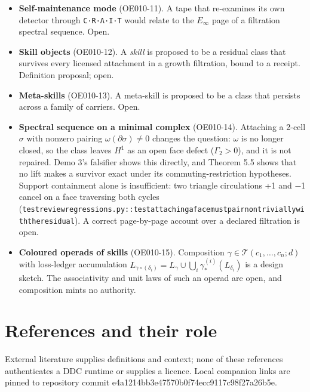 \documentclass[
  11pt,
]{article}
\providecommand{\tightlist}{%
  \setlength{\itemsep}{0pt}\setlength{\parskip}{0pt}}
\renewcommand{\_}{\ddcunderscore\allowbreak}
\begin{document}
\begin{itemize}
\tightlist
\item
  \textbf{Self-maintenance mode} (OE010-11). A tape that re-examines its
  own detector through \texttt{C·R·Λ·I·T} would relate to the
  \(E_\infty\) page of a filtration spectral sequence. Open.
\item
  \textbf{Skill objects} (OE010-12). A \emph{skill} is proposed to be a
  residual class that survives every licensed attachment in a growth
  filtration, bound to a receipt. Definition proposal; open.
\item
  \textbf{Meta-skills} (OE010-13). A meta-skill is proposed to be a
  class that persists across a family of carriers. Open.
\item
  \textbf{Spectral sequence on a minimal complex} (OE010-14). Attaching
  a 2-cell \(\sigma\) with nonzero pairing
  \(\omega(\partial\sigma) \ne 0\) changes the question: \(\omega\) is
  no longer closed, so the class leaves \(H^1\) as an open face defect
  (\(\Gamma_2 > 0\)), and it is not repaired. Demo 3's falsifier shows
  this directly, and Theorem 5.5 shows that no lift makes a survivor
  exact under its commuting-restriction hypotheses. Support containment
  alone is insufficient: two triangle circulations +1 and −1 cancel on a
  face traversing both cycles
  (\texttt{test\_review\_regressions.\allowbreak py::test\_attaching\_a\_face\_must\_pair\_nontrivially\_with\_the\_residual}).
  A correct page-by-page account over a declared filtration is open.
\item
  \textbf{Coloured operads of skills} (OE010-15). Composition
  \(\gamma \in \mathcal{T}(c_1, \dots, c_n; d)\) with loss-ledger
  accumulation
  \(L_{\gamma \circ (\delta_i)} = L_\gamma \cup \bigcup_i \gamma^{(i)}_*(L_{\delta_i})\)
  is a design sketch. The associativity and unit laws of such an operad
  are open, and composition mints no authority.
\end{itemize}

\newpage

\section{References and their role}\label{references-and-their-role}

External literature supplies definitions and context; none of these
references authenticates a DDC runtime or supplies a licence. Local
companion links are pinned to repository commit
e4a1214bb3e47570b0f74ecc9117c98f27a26b5e.
\end{document}
